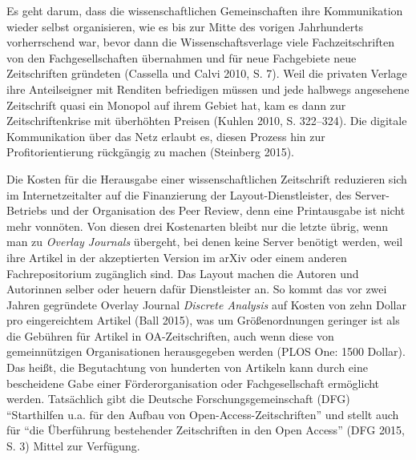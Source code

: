 \documentclass[a4paper,
fontsize=11pt,
oneside,
numbers=noperiodatend,
parskip=half-,
bibliography=totoc,
final
]{scrartcl}
\begin{document}
Es geht darum, dass die wissenschaftlichen Gemeinschaften ihre
Kommunikation wieder selbst organisieren, wie es bis zur Mitte des
vorigen Jahrhunderts vorherrschend war, bevor dann die
Wissenschaftsverlage viele Fachzeitschriften von den Fachgesellschaften
übernahmen und für neue Fachgebiete neue Zeitschriften gründeten
(Cassella und Calvi 2010, S. 7). Weil die privaten Verlage ihre
Anteilseigner mit Renditen befriedigen müssen und jede halbwegs
angesehene Zeitschrift quasi ein Monopol auf ihrem Gebiet hat, kam es
dann zur Zeitschriftenkrise mit überhöhten Preisen (Kuhlen 2010, S.
322--324). Die digitale Kommunikation über das Netz erlaubt es, diesen
Prozess hin zur Profitorientierung rückgängig zu machen (Steinberg
2015).

Die Kosten für die Herausgabe einer wissenschaftlichen Zeitschrift
reduzieren sich im Internetzeitalter auf die Finanzierung der
Layout-Dienstleister, des Server-Betriebs und der Organisation des Peer
Review, denn eine Printausgabe ist nicht mehr vonnöten. Von diesen drei
Kostenarten bleibt nur die letzte übrig, wenn man zu \emph{Overlay
Journals} übergeht, bei denen keine Server benötigt werden, weil ihre
Artikel in der akzeptierten Version im arXiv oder einem anderen
Fachrepositorium zugänglich sind. Das Layout machen die Autoren und
Autorinnen selber oder heuern dafür Dienstleister an. So kommt das vor
zwei Jahren gegründete Overlay Journal \emph{Discrete Analysis} auf
Kosten von zehn Dollar pro eingereichtem Artikel (Ball 2015), was um
Größenordnungen geringer ist als die Gebühren für Artikel in
OA-Zeitschriften, auch wenn diese von gemeinnützigen Organisationen
herausgegeben werden (PLOS One: 1500 Dollar). Das heißt, die
Begutachtung von hunderten von Artikeln kann durch eine bescheidene Gabe
einer Förderorganisation oder Fachgesellschaft ermöglicht werden.
Tatsächlich gibt die Deutsche Forschungsgemeinschaft (DFG)
\enquote{Starthilfen u.a. für den Aufbau von Open-Access-Zeitschriften}
und stellt auch für \enquote{die Überführung bestehender Zeitschriften
in den Open Access} (DFG 2015, S. 3) Mittel zur Verfügung.
\end{document}
